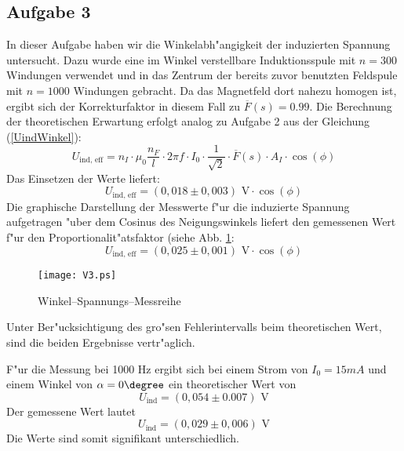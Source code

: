 \documentclass[a4paper,10pt]{article}
\begin{document}
\subsection{Aufgabe 3}
In dieser Aufgabe haben wir die Winkelabh"angigkeit der induzierten Spannung untersucht. Dazu wurde eine im Winkel verstellbare Induktionsspule mit $n=300$ Windungen verwendet und in das Zentrum der bereits zuvor benutzten Feldspule mit $n=1000$ Windungen gebracht. Da das Magnetfeld dort nahezu homogen ist, ergibt sich der Korrekturfaktor in diesem Fall zu $\overline{F}(s)=0.99$. Die Berechnung der theoretischen Erwartung erfolgt analog zu Aufgabe 2 aus der Gleichung (\ref{UindWinkel}):
\begin{equation}
U_\text{ind, eff} = n_I \cdot \mu_0 \frac{n_F}{l} \cdot 2 \pi f \cdot I_0 \cdot \frac{1}{\sqrt{2}} \cdot \overline{F}(s)  \cdot A_I \cdot \cos(\phi)
\end{equation}
Das Einsetzen der Werte liefert:
\begin{equation}
U_\text{ind, eff} = (0,018 \pm 0,003) \text{ V} \cdot \cos(\phi)
\end{equation}
Die graphische Darstellung der Messwerte f"ur die induzierte Spannung aufgetragen "uber dem Cosinus des Neigungswinkels liefert den gemessenen Wert f"ur den Proportionalit"atsfaktor (siehe Abb. \ref{fig:3}:
\begin{equation}
U_\text{ind, eff} = (0,025 \pm 0,001) \text{ V} \cdot \cos(\phi)
\end{equation}
\begin{figure}[htb]
	\centering
	     \texttt{[image: V3.ps]}
	     \caption{Winkel--Spannungs--Messreihe}
       \label{fig:3}
\end{figure}
Unter Ber"ucksichtigung des gro"sen Fehlerintervalls beim theoretischen Wert, sind die beiden Ergebnisse vertr"aglich.

F"ur die Messung bei 1000 Hz ergibt sich bei einem Strom von $I_0= 15 mA$ und einem Winkel von $\alpha = 0\degree$ ein theoretischer Wert von
\begin{equation}
U_\text{ind} = (0,054 \pm 0.007) \text{ V}
\end{equation}
Der gemessene Wert lautet
\begin{equation}
U_\text{ind} = (0,029 \pm 0,006) \text{ V}
\end{equation}
Die Werte sind somit signifikant unterschiedlich.

\newpage
\end{document}
